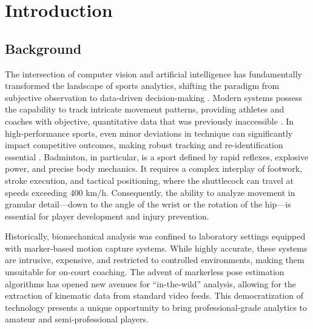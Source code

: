 \documentclass[pdflatex,sn-mathphys-num]{sn-jnl}%
\theoremstyle{thmstyleone}%
\theoremstyle{thmstyletwo}%
\theoremstyle{thmstylethree}%
\begin{document}
\maketitle


\section{Introduction}\label{sec1}

\subsection{Background}
The intersection of computer vision and artificial intelligence has fundamentally transformed the landscape of sports analytics, shifting the paradigm from subjective observation to data-driven decision-making \cite{b1}. Modern systems possess the capability to track intricate movement patterns, providing athletes and coaches with objective, quantitative data that was previously inaccessible \cite{b2}. In high-performance sports, even minor deviations in technique can significantly impact competitive outcomes, making robust tracking and re-identification essential \cite{b3}. Badminton, in particular, is a sport defined by rapid reflexes, explosive power, and precise body mechanics. It requires a complex interplay of footwork, stroke execution, and tactical positioning, where the shuttlecock can travel at speeds exceeding 400 km/h. Consequently, the ability to analyze movement in granular detail---down to the angle of the wrist or the rotation of the hip---is essential for player development and injury prevention.

Historically, biomechanical analysis was confined to laboratory settings equipped with marker-based motion capture systems. While highly accurate, these systems are intrusive, expensive, and restricted to controlled environments, making them unsuitable for on-court coaching. The advent of markerless pose estimation algorithms has opened new avenues for ``in-the-wild'' analysis, allowing for the extraction of kinematic data from standard video feeds. This democratization of technology presents a unique opportunity to bring professional-grade analytics to amateur and semi-professional players.
\end{document}
